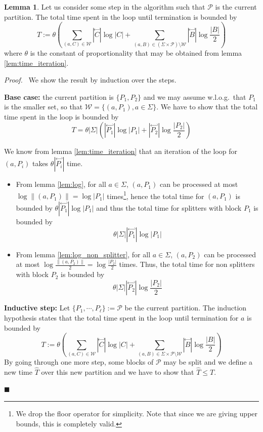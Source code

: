 \documentclass[12pt, a4 paper]{article}
\renewenvironment{proof}[1][Proof]{\begin{mdframed}[backgroundcolor=black!5, topline=false, rightline=false, bottomline=false, linecolor=black!15, linewidth=3pt]{\noindent\textit{#1.}\ }}{\noindent\par\hfill$\blacksquare$\end{mdframed}}
\theoremstyle{definition}
\newtheorem{lemma}{Lemma}
\begin{document}
\begin{lemma}\label{lem:bound}
    Let us consider some step in the algorithm such that $\mathcal{P}$ is the current partition. The total time spent in the loop until termination is bounded by
    $$ T := \theta \left(\sum_{(a, C) \in \mathcal{W}} | \overset{\hookleftarrow}{C} | \log | C | + \sum_{(a, B) \in (\Sigma\times \mathcal{P})\setminus \mathcal{W}} | \overset{\hookleftarrow}{B} | \log \frac{| B |}{2} \right)$$
    where $\theta$ is the constant of proportionality that may be obtained from lemma \ref{lem:time_iteration}.
\end{lemma}
\begin{proof}
    We show the result by induction over the steps.

    \bigskip
    \textbf{Base case:} the current partition is $\{P_1, P_2\}$ and we may assume w.l.o.g.\ that $P_1$ is the smaller set, so that $\mathcal{W} = \{(a, P_1), a \in \Sigma\}$.
    We have to show that the total time spent in the loop is bounded by
    $$T = \theta |\Sigma| \left(| \overset{\hookleftarrow}{P_1} | \log | P_1 | + | \overset{\hookleftarrow}{P_2} | \log \frac{| P_2 |}{2}\right)$$
    
    We know from lemma \ref{lem:time_iteration} that an iteration of the loop for $(a, P_i)$ takes $\theta | \overset{\hookleftarrow}{P_i} | $ time.
    \begin{itemize}
        \item From lemma \ref{lem:log}, for all $a\in\Sigma$, $(a, P_1)$ can be processed at most $\log \| (a, P_1) \| = \log |P_1|$ times\footnote{We drop the floor operator for simplicity. Note that since we are giving upper bounds, this is completely valid.}, hence the total time for $(a, P_1)$ is bounded by $\theta | \overset{\hookleftarrow}{P_1} | \log | P_1 |$ and thus the total time for splitters with block $P_1$ is bounded by
        $$\theta |\Sigma| | \overset{\hookleftarrow}{P_1} | \log | P_1 |$$

        \item From lemma \ref{lem:log_non_splitter}, for all $a\in\Sigma$, $(a, P_2)$ can be processed at most $\log \frac{\| (a, P_2) \|}{2} = \log \frac{| P_2 |}{2}$ times. Thus, the total time for non splitters with block $P_2$ is bounded by
        $$ \theta |\Sigma| | \overset{\hookleftarrow}{P_2} | \log \frac{| P_2 |}{2}$$
    \end{itemize}
    
    \textbf{Inductive step:} Let $\{P_1, \cdots, P_\ell\} := \mathcal{P}$ be the current partition. The induction hypothesis states that the total time spent in the loop until termination for $a$ is bounded by
    $$ T := \theta \left(\sum_{(a, C) \in \mathcal{W}} | \overset{\hookleftarrow}{C} | \log | C | + \sum_{(a, B) \in \Sigma\times \mathcal{P}\setminus \mathcal{W}} | \overset{\hookleftarrow}{B} | \log \frac{| B |}{2} \right)$$
    By going through one more step, some blocks of $\mathcal{P}$ may be split and we define a new time $\hat{T}$ over this new partition and we have to show that $\hat{T} \leq T$.


\end{proof}
\end{document}
